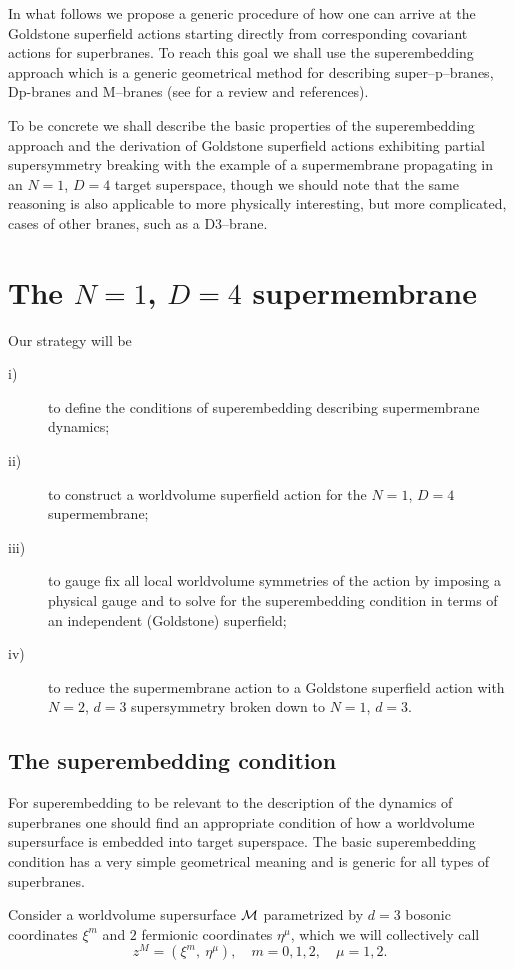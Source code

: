 \documentclass[a4paper,12pt]{article}
\begin{document}
In what follows we propose a generic procedure of how one can
arrive at the Goldstone superfield actions starting directly from
corresponding covariant actions for superbranes. To reach this
goal we shall use the superembedding approach  which is a generic
geometrical method for describing super--p--branes, Dp-branes and
M--branes (see \cite{s} for a review and references).

To be concrete we shall describe the basic properties of the
superembedding approach and the derivation of Goldstone
superfield actions exhibiting partial supersymmetry breaking with
the example of a supermembrane propagating in an $N=1$, $D=4$
target superspace, though we should note that the same reasoning
is also applicable to more physically interesting, but more
complicated, cases of other branes, such as a D3--brane.

\section{The $N=1$, $D=4$ supermembrane}
Our strategy will be
\begin{description}
\item[i)]
to define the conditions of superembedding describing
supermembrane dynamics;
\item[ii)]
to construct a worldvolume superfield action for the $N=1$, $D=4$
supermembrane;
\item[iii)]
to gauge fix all local worldvolume symmetries of the action by
imposing a physical gauge and to solve for the superembedding
condition in terms of an independent (Goldstone) superfield;
\item[iv)]
to reduce the supermembrane action to a Goldstone superfield
action with $N=2$, $d=3$ supersymmetry broken down to $N=1$,
$d=3$.
\end{description}

\subsection{The superembedding condition}
For superembedding to be relevant to the description of the
dynamics of superbranes one should find an appropriate condition
of how a worldvolume supersurface is embedded into target
superspace. The basic superembedding condition has a very simple
geometrical meaning and is generic for all types of superbranes.

Consider a worldvolume supersurface ${\cal M}$ parametrized by
$d=3$ bosonic coordinates $\xi^m$ and ${2}$ fermionic
coordinates $\eta^\mu$, which we will collectively call
\begin{equation}\label{z}
z^M=(\xi^m,~\eta^\mu), \quad m=0,1,2, \quad \mu=1,2.
\end{equation}
\end{document}
